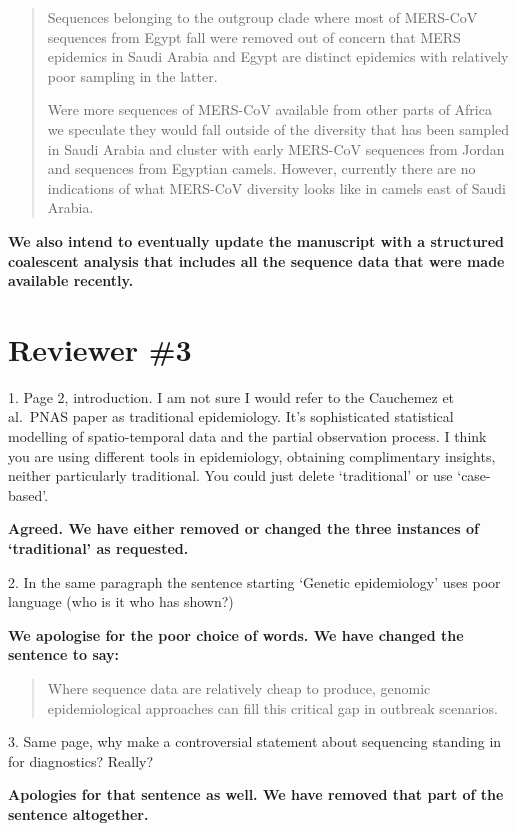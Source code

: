 \documentclass[11pt,oneside,letterpaper]{article}
\begin{document}
\begin{quotation}
Sequences belonging to the outgroup clade where most of MERS-CoV sequences from Egypt fall were removed out of concern that MERS epidemics in Saudi Arabia and Egypt are distinct epidemics with relatively poor sampling in the latter.

Were more sequences of MERS-CoV available from other parts of Africa we speculate they would fall outside of the diversity that has been sampled in Saudi Arabia and cluster with early MERS-CoV sequences from Jordan and sequences from Egyptian camels.
However, currently there are no indications of what MERS-CoV diversity looks like in camels east of Saudi Arabia.
\end{quotation}

\textbf{We also intend to eventually update the manuscript with a structured coalescent analysis that includes all the sequence data that were made available recently.}

\section*{Reviewer \#3}

1. Page 2, introduction. I am not sure I would refer to the Cauchemez et al.\ PNAS paper as traditional epidemiology. It's sophisticated statistical modelling of spatio-temporal data and the partial observation process. I think you are using different tools in epidemiology, obtaining complimentary insights, neither particularly traditional. You could just delete `traditional' or use `case-based'.

\textbf{Agreed. We have either removed or changed the three instances of `traditional' as requested.}

2. In the same paragraph the sentence starting `Genetic epidemiology' uses poor language (who is it who has shown?)

\textbf{We apologise for the poor choice of words. We have changed the sentence to say:}

\begin{quotation}
Where sequence data are relatively cheap to produce, genomic epidemiological approaches can fill this critical gap in outbreak scenarios.
\end{quotation}

3. Same page, why make a controversial statement about sequencing standing in for diagnostics? Really?

\textbf{Apologies for that sentence as well. We have removed that part of the sentence altogether.}
\end{document}
